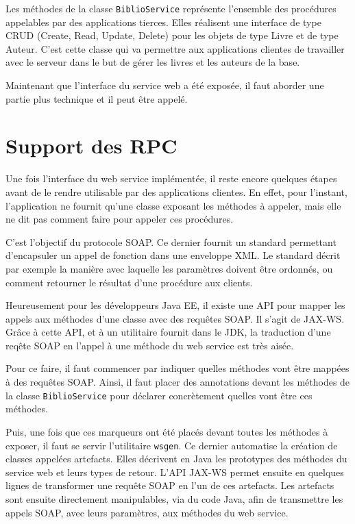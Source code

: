 
Les méthodes de la classe \verb|BiblioService| représente l’ensemble des procédures appelables par des applications tierces. Elles réalisent une interface de type CRUD (Create, Read, Update, Delete) pour les objets de type Livre et de type Auteur. C’est cette classe qui va permettre aux applications clientes de travailler avec le serveur dans le but de gérer les livres et les auteurs de la base.

Maintenant que l’interface du service web a été exposée, il faut aborder une partie plus technique et il peut être appelé.


\section{Support des RPC}
Une fois l’interface du web service implémentée, il reste encore quelques étapes avant de le rendre utilisable par des applications clientes. En effet, pour l’instant, l’application ne fournit qu’une classe exposant les méthodes à appeler, mais elle ne dit pas comment faire pour appeler ces procédures.

C’est l’objectif du protocole SOAP. Ce dernier fournit un standard permettant d’encapsuler un appel de fonction dans une enveloppe XML. Le standard décrit par exemple la manière avec laquelle les paramètres doivent être ordonnés, ou comment retourner le résultat d’une procédure aux clients.

Heureusement pour les développeurs Java EE, il existe une API pour mapper les appels aux méthodes d’une classe avec des requêtes SOAP. Il s’agit de JAX-WS. Grâce à cette API, et à un utilitaire fournit dans le JDK, la traduction d’une reqête SOAP en l’appel à une méthode du web service est très aisée.

Pour ce faire, il faut commencer par indiquer quelles méthodes vont être mappées à des requêtes SOAP. Ainsi, il faut placer des annotations devant les méthodes de la classe \verb|BiblioService| pour déclarer concrètement quelles vont être ces méthodes.

Puis, une fois que ces marqueurs ont été placés devant toutes les méthodes à exposer, il faut se servir l’utilitaire \verb|wsgen|. Ce dernier automatise la création de classes appelées artefacts. Elles décrivent en Java les prototypes des méthodes du service web et leurs types de retour. L’API JAX-WS permet ensuite en quelques lignes de transformer une requête SOAP en l’un de ces artefacts. Les artefacts sont ensuite directement manipulables, via du code Java, afin de transmettre les appels SOAP, avec leurs paramètres, aux méthodes du web service.

